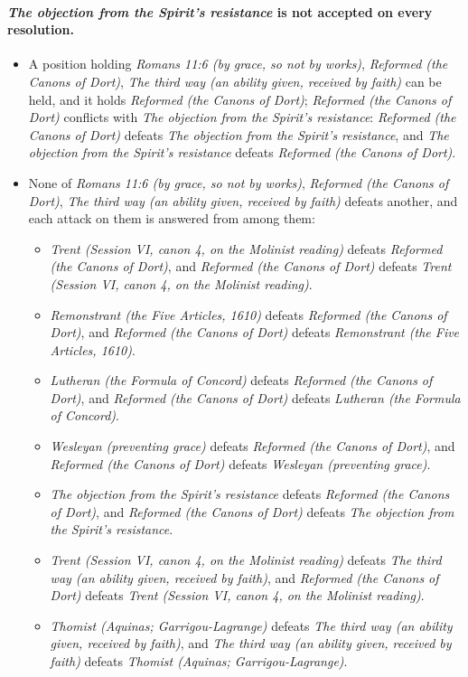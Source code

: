 \documentclass[11pt]{article}
\begin{document}
\paragraph{\emph{The objection from the Spirit’s resistance} is not accepted on every resolution.}
\begin{itemize}
\item A position holding \emph{Romans 11:6 (by grace, so not by works)}, \emph{Reformed (the Canons of Dort)}, \emph{The third way (an ability given, received by faith)} can be held, and it holds \emph{Reformed (the Canons of Dort)}; \emph{Reformed (the Canons of Dort)} conflicts with \emph{The objection from the Spirit’s resistance}: \emph{Reformed (the Canons of Dort)} defeats \emph{The objection from the Spirit’s resistance}, and \emph{The objection from the Spirit’s resistance} defeats \emph{Reformed (the Canons of Dort)}.
\item None of \emph{Romans 11:6 (by grace, so not by works)}, \emph{Reformed (the Canons of Dort)}, \emph{The third way (an ability given, received by faith)} defeats another, and each attack on them is answered from among them:
\begin{itemize}
\item \emph{Trent (Session VI, canon 4, on the Molinist reading)} defeats \emph{Reformed (the Canons of Dort)}, and \emph{Reformed (the Canons of Dort)} defeats \emph{Trent (Session VI, canon 4, on the Molinist reading)}.
\item \emph{Remonstrant (the Five Articles, 1610)} defeats \emph{Reformed (the Canons of Dort)}, and \emph{Reformed (the Canons of Dort)} defeats \emph{Remonstrant (the Five Articles, 1610)}.
\item \emph{Lutheran (the Formula of Concord)} defeats \emph{Reformed (the Canons of Dort)}, and \emph{Reformed (the Canons of Dort)} defeats \emph{Lutheran (the Formula of Concord)}.
\item \emph{Wesleyan (preventing grace)} defeats \emph{Reformed (the Canons of Dort)}, and \emph{Reformed (the Canons of Dort)} defeats \emph{Wesleyan (preventing grace)}.
\item \emph{The objection from the Spirit’s resistance} defeats \emph{Reformed (the Canons of Dort)}, and \emph{Reformed (the Canons of Dort)} defeats \emph{The objection from the Spirit’s resistance}.
\item \emph{Trent (Session VI, canon 4, on the Molinist reading)} defeats \emph{The third way (an ability given, received by faith)}, and \emph{Reformed (the Canons of Dort)} defeats \emph{Trent (Session VI, canon 4, on the Molinist reading)}.
\item \emph{Thomist (Aquinas; Garrigou-Lagrange)} defeats \emph{The third way (an ability given, received by faith)}, and \emph{The third way (an ability given, received by faith)} defeats \emph{Thomist (Aquinas; Garrigou-Lagrange)}.
\end{itemize}
\end{itemize}
\end{document}
